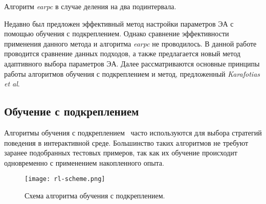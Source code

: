 \begin{algorithm}[h!]
    \caption{Алгоритм \textit{earpc} в случае деления на два подинтервала.}
    \label{earpc_scheme}
    \begin{algorithmic}[1]
	      \ENDIF
	    \ENDFOR
	\ENDFOR
    \end{algorithmic}
\end{algorithm}

Недавно был предложен эффективный метод настройки параметров ЭА с помощью обучения с подкреплением. Однако сравнение эффективности применения данного метода и алгоритма \textit{earpc} не проводилось. В данной работе проводится сравнение данных подходов, а также предлагается новый метод адаптивного выбора параметров ЭА. Далее рассматриваются основные принципы работы алгоритмов обучения с подкреплением и метод, предложенный \textit{Karafotias et al}.

\subsection{Обучение с подкреплением}
\label{rl}
Алгоритмы обучения с подкреплением~\cite{sutton,gosavi} часто используются для выбора стратегий поведения в интерактивной среде. Большинство таких алгоритмов не требуют заранее подобранных тестовых примеров, так как их обучение происходит одновременно с применением накопленного опыта.

\begin{figure}
    \centering
    \texttt{[image: rl-scheme.png]}
    \caption{Схема алгоритма обучения с подкреплением.}
    \label{rl_scheme}
\end{figure}


